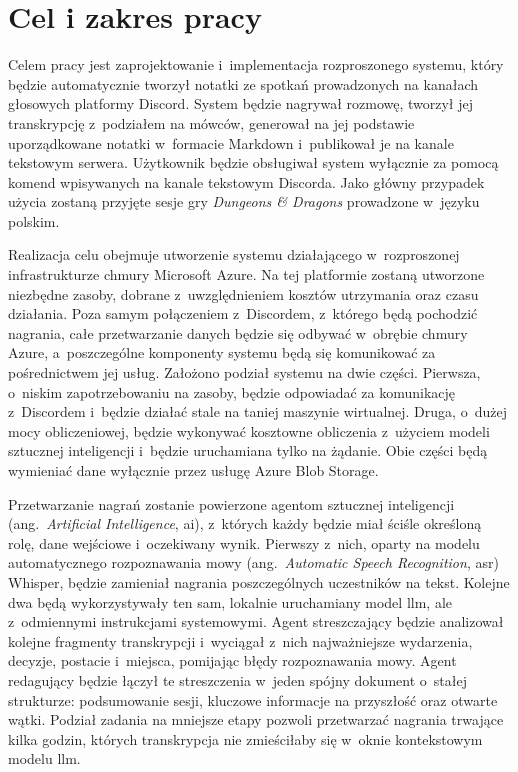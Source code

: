 \section{Cel i zakres pracy}
\label{sec:wstep:cel}

Celem pracy jest zaprojektowanie i~implementacja rozproszonego systemu, który
będzie automatycznie tworzył notatki ze spotkań prowadzonych na kanałach
głosowych platformy Discord. System będzie nagrywał rozmowę, tworzył jej
transkrypcję z~podziałem na mówców, generował na jej podstawie uporządkowane
notatki w~formacie Markdown i~publikował je na kanale tekstowym serwera.
Użytkownik będzie obsługiwał system wyłącznie za pomocą komend wpisywanych na
kanale tekstowym Discorda. Jako główny przypadek użycia zostaną przyjęte sesje
gry \textit{Dungeons \& Dragons} prowadzone w~języku polskim.

Realizacja celu obejmuje utworzenie systemu działającego w~rozproszonej
infrastrukturze chmury Microsoft Azure. Na tej platformie zostaną utworzone
niezbędne zasoby, dobrane z~uwzględnieniem kosztów utrzymania oraz czasu
działania. Poza samym połączeniem z~Discordem, z~którego będą pochodzić
nagrania, całe przetwarzanie danych będzie się odbywać w~obrębie chmury Azure,
a~poszczególne komponenty systemu będą się komunikować za pośrednictwem jej
usług. Założono podział systemu na dwie części. Pierwsza, o~niskim zapotrzebowaniu
na zasoby, będzie odpowiadać za komunikację z~Discordem i~będzie działać stale
na taniej maszynie wirtualnej. Druga, o~dużej mocy obliczeniowej, będzie
wykonywać kosztowne obliczenia z~użyciem modeli sztucznej inteligencji
i~będzie uruchamiana tylko na żądanie. Obie części będą wymieniać dane
wyłącznie przez usługę Azure Blob Storage.

Przetwarzanie nagrań zostanie powierzone agentom sztucznej inteligencji
(ang.~\textit{Artificial Intelligence}, \acs{ai}), z~których każdy będzie miał
ściśle określoną rolę, dane wejściowe i~oczekiwany wynik. Pierwszy z~nich,
oparty na modelu automatycznego rozpoznawania mowy (ang.~\textit{Automatic
Speech Recognition}, \acs{asr}) Whisper, będzie zamieniał nagrania
poszczególnych uczestników na tekst. Kolejne dwa będą wykorzystywały ten sam,
lokalnie uruchamiany model \acs{llm}, ale z~odmiennymi instrukcjami
systemowymi. Agent streszczający będzie analizował
kolejne fragmenty transkrypcji i~wyciągał z~nich najważniejsze wydarzenia,
decyzje, postacie i~miejsca, pomijając błędy rozpoznawania mowy.
Agent redagujący będzie łączył te streszczenia w~jeden spójny dokument
o~stałej strukturze: podsumowanie sesji, kluczowe informacje na przyszłość
oraz otwarte wątki. Podział zadania na mniejsze etapy
pozwoli przetwarzać nagrania trwające kilka godzin, których transkrypcja nie
zmieściłaby się w~oknie kontekstowym modelu \acs{llm}.

